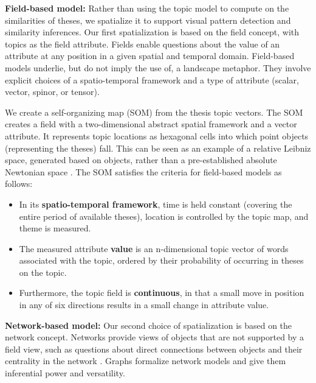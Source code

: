 \documentclass[a4paper,UKenglish]{lipics-v2018}
\begin{document}
\noindent \textbf{Field-based model:} Rather than using the topic model to compute on the similarities of theses, we spatialize it to support visual pattern detection and similarity inferences. Our first spatialization is based on the field concept, with topics as the field attribute. Fields enable questions about the value of an attribute at any position in a given spatial and temporal domain. Field-based models underlie, but do not imply the use of, a landscape metaphor. They involve explicit choices of a spatio-temporal framework and a type of attribute (scalar, vector, spinor, or tensor).

We create a self-organizing map (SOM) from the thesis topic vectors. The SOM creates a field with a two-dimensional abstract spatial framework and a vector attribute. It represents topic locations as hexagonal cells into which point objects (representing the theses) fall. This can be seen as an example of a relative Leibniz space, generated based on objects, rather than a pre-established absolute Newtonian space \cite{ArthurRichard1994SaRi}. The SOM satisfies the criteria for field-based models as follows: 

\begin{itemize}
     \item In its \textbf{spatio-temporal framework}, time is held constant (covering the entire period of available theses), location is controlled by the topic map, and theme is measured.
    \item The measured attribute \textbf{value} is an n-dimensional topic vector of words associated with the topic, ordered by their probability of occurring in theses on the topic.
    \item Furthermore, the topic field is \textbf{continuous}, in that a small move in position in any of six directions results in a small change in attribute value. 
\end{itemize} 

\noindent \textbf{Network-based model:} Our second choice of spatialization is based on the network concept. Networks provide views of objects that are not supported by a field view, such as questions about direct connections between objects and their centrality in the network \cite{Kuhn2012e}. Graphs formalize network models and give them inferential power and versatility.

\end{document}
